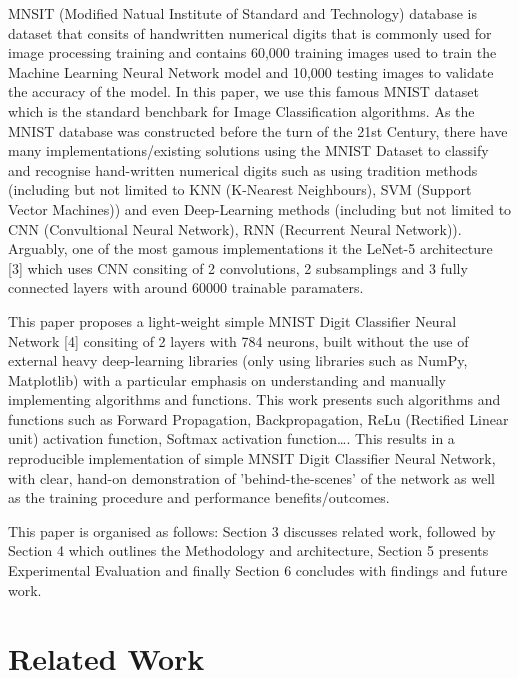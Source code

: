 \documentclass[11pt]{article}
\begin{document}
\vspace{1em}
MNSIT (Modified Natual Institute of Standard and Technology) database is dataset that consits of handwritten numerical digits that is commonly used for image processing training and contains 60,000 training images used to train the Machine Learning Neural Network model and 10,000 testing images to validate the accuracy of the model. In this paper, we use this famous MNIST dataset which is the standard benchbark for Image Classification algorithms. As the MNIST database was constructed before the turn of the 21st Century, there have many implementations/existing solutions using the MNIST Dataset to classify and recognise hand-written numerical digits such as using tradition methods (including but not limited to KNN (K-Nearest Neighbours), SVM (Support Vector Machines)) and even Deep-Learning methods (including but not limited to CNN (Convultional Neural Network), RNN (Recurrent Neural Network)). Arguably, one of the most gamous implementations it the LeNet-5 architecture [3] which uses CNN consiting of 2 convolutions, 2 subsamplings and 3 fully connected layers with around 60000 trainable paramaters.

\vspace{1em}
This paper proposes a light-weight simple MNIST Digit Classifier Neural Network [4] consiting of 2 layers with 784 neurons, built without the use of external heavy deep-learning libraries  (only using libraries such as NumPy, Matplotlib) with a particular emphasis on understanding and manually implementing algorithms and functions. This work presents such algorithms and functions such as Forward Propagation, Backpropagation, ReLu (Rectified Linear unit) activation function, Softmax activation function\dots. This results in a reproducible implementation of simple MNSIT Digit Classifier Neural Network, with clear, hand-on demonstration of 'behind-the-scenes' of the network as well as the training procedure and performance benefits/outcomes.

\vspace{1em}
This paper is organised as follows: Section 3 discusses related work, followed by Section 4 which outlines the Methodology and architecture, Section 5 presents Experimental Evaluation and finally Section 6 concludes with findings and future work.


\section{Related Work}
\end{document}
